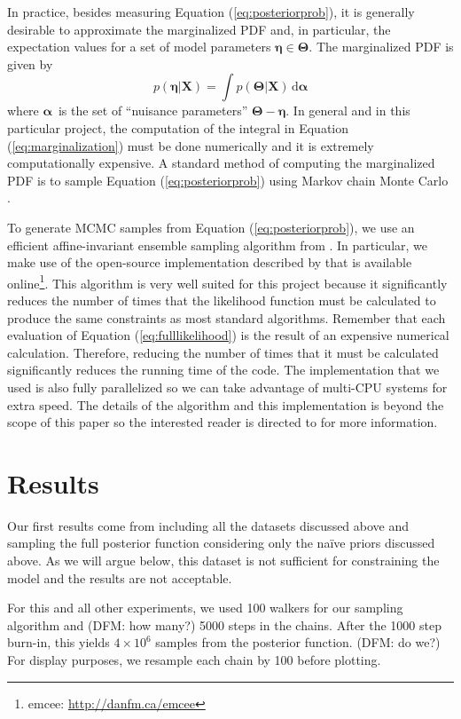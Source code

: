 \documentclass[preprint,12pt]{aastex}
\newcommand{\project}[1]{{\sffamily #1}}
\newcommand{\eqlabel}[1]{\label{eq:#1}}
\newcommand{\eq}[1]{Equation (\ref{eq:#1})}
\newcommand{\dd}{\,\mathrm{d}}
\newcommand{\bvec}[1]{\ensuremath{\boldsymbol{#1}}}
\renewcommand{\vector}[1]{\ensuremath{\bvec{#1}}}
\newcommand{\model}{\vector{\Theta}}
\newcommand{\physical}{\vector{\eta}}
\newcommand{\nuisance}{\vector{\alpha}}
\newcommand{\data}{\vector{X}}
\newcommand{\prob}{\ensuremath{p}}
\newcommand{\pr}{\prob}
\begin{document}
In practice, besides measuring \eq{posteriorprob}, it is generally desirable
to approximate the marginalized PDF and, in particular, the expectation values
for a set of model parameters $\physical \in \model$. The marginalized PDF
is given by
\begin{equation}\eqlabel{marginalization}
    \pr (\physical | \data) = \int \pr (\model | \data) \dd \nuisance
\end{equation}
where \nuisance\ is the set of ``nuisance parameters'' $\model - \physical$.
In general and in this particular project, the computation of the integral
in \eq{marginalization} must be done numerically and it is extremely
computationally expensive. A standard method of computing the marginalized
PDF is to sample \eq{posteriorprob} using Markov chain Monte Carlo
\citep[MCMC; e.g.][]{MacKay:2003,Gregory:2005}.

To generate MCMC samples from \eq{posteriorprob}, we use an efficient
affine-invariant ensemble sampling algorithm from \citet{Goodman:2010}. In
particular, we make use of the open-source implementation described
by \citet{emcee} that is available
online\footnote{\project{emcee}: \url{http://danfm.ca/emcee}}. This algorithm
is very well suited for this project because it significantly reduces the
number of times that the likelihood function must be calculated to produce
the same constraints as most standard algorithms.
Remember that each evaluation of \eq{fulllikelihood} is the result of an
expensive numerical calculation. Therefore, reducing the number of times
that it must be calculated significantly reduces the running time of the
code. The implementation that we used is also fully parallelized so we can
take advantage of multi-CPU systems for extra speed. The details of the
algorithm and this implementation is beyond the scope of this paper so the
interested reader is directed to \citet{emcee} for more information.


\section{Results}

Our first results come from including all the datasets discussed above and
sampling the full posterior function considering only the na\"ive priors
discussed above. As we will argue below, this dataset is not sufficient
for constraining the model and the results are not acceptable.

For this and all other experiments, we used 100 walkers for our sampling
algorithm and (DFM: how many?) 5000 steps in the chains. After the 1000
step burn-in, this yields $4\times10^6$ samples from the posterior function.
(DFM: do we?) For display purposes, we resample each chain by 100 before
plotting.
\end{document}
